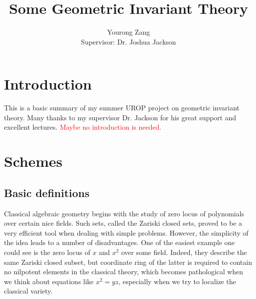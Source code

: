 \documentclass[12pt]{article}
\title{Some Geometric Invariant Theory}
\author{Yourong Zang\\ Supervisor: Dr. Joshua Jackson}
\theoremstyle{remark}
\theoremstyle{definition}
\begin{document}
    \maketitle
    \tableofcontents
    \newpage
    \section{Introduction}
    This is a basic summary of my summer UROP project on geometric invariant theory. Many thanks to my supervisor Dr. Jackson for his great support and excellent lectures.
    \textcolor{red}{Maybe no introduction is needed.}
    \section{Schemes}
    \subsection{Basic definitions}
    Classical algebraic geometry begins with the study of zero locus of polynomials over certain nice fields. Such sets, called the Zariski closed sets, proved to be a very efficient tool when dealing with simple problems. However, the simplicity of the idea leads to a number of disadvantages. One of the easiest example one could see is the zero locus of $x$ and $x^2$ over some field. Indeed, they describe the same Zariski closed subset, but coordinate ring of the latter is required to contain no nilpotent elements in the classical theory, which becomes pathological when we think about equations like $x^2=yz$, especially when we try to localize the classical variety.
    
\end{document}
